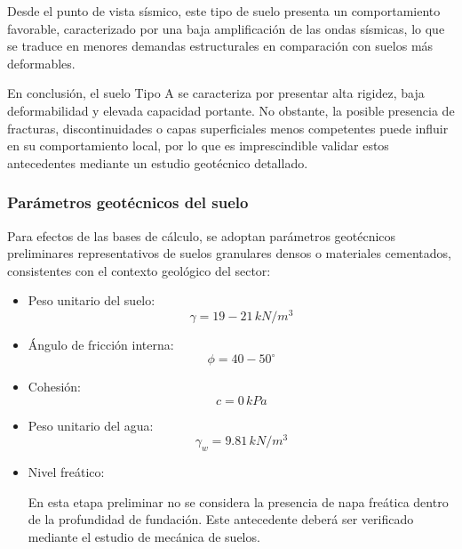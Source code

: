 Desde el punto de vista sísmico, este tipo de suelo presenta un comportamiento favorable, caracterizado por una baja amplificación de las ondas sísmicas, lo que se traduce en menores demandas estructurales en comparación con suelos más deformables.

En conclusión, el suelo Tipo A se caracteriza por presentar alta rigidez, baja deformabilidad y elevada capacidad portante. No obstante, la posible presencia de fracturas, discontinuidades o capas superficiales menos competentes puede influir en su comportamiento local, por lo que es imprescindible validar estos antecedentes mediante un estudio geotécnico detallado.

\subsubsection{Parámetros geotécnicos del suelo}

Para efectos de las bases de cálculo, se adoptan parámetros geotécnicos preliminares representativos de suelos granulares densos o materiales cementados, consistentes con el contexto geológico del sector:

\begin{itemize}
    \item Peso unitario del suelo:
    \begin{equation}
    \gamma = 19-21 \, kN/m^3
    \end{equation}

    \item Ángulo de fricción interna:
    \begin{equation}
    \phi = 40-50^\circ
    \end{equation}

    \item Cohesión:
    \begin{equation}
    c = 0 \, kPa
    \end{equation}

    \item Peso unitario del agua:
    \begin{equation}
    \gamma_w = 9.81 \, kN/m^3
    \end{equation}

    \item Nivel freático:

    En esta etapa preliminar no se considera la presencia de napa freática dentro de la profundidad de fundación. Este antecedente deberá ser verificado mediante el estudio de mecánica de suelos.
\end{itemize}

